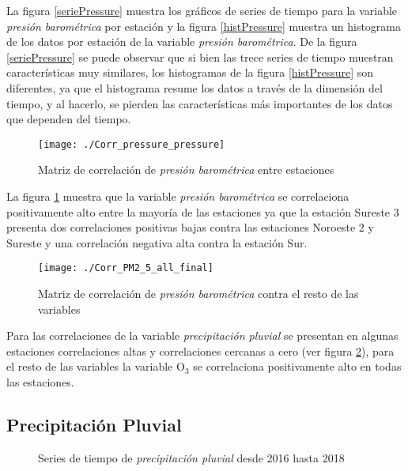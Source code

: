 La figura \ref{seriePressure} muestra los gráficos de series de tiempo para la variable {\em presión barométrica} por estación y la figura \ref{histPressure} muestra un histograma de los datos por estación de la variable {\em presión barométrica}. De la figura \ref{seriePressure} se puede observar que si bien las trece series de tiempo muestran características muy similares, los histogramas de la figura \ref{histPressure} son diferentes, ya que el histograma resume los datos a través de la dimensión del tiempo, y al hacerlo, se pierden las características más importantes de los datos que dependen del tiempo.

\begin{figure}[H]
\centering
\texttt{[image: ./Corr\_pressure\_pressure]}
\caption{Matriz de correlación de {\em presión barométrica} entre estaciones }
\label{corrpressure2}
\end{figure}

La figura \ref{corrpressure2} muestra que la variable {\em presión barométrica} se correlaciona positivamente alto entre la mayoría de las estaciones ya que la estación Sureste 3 presenta dos correlaciones positivas bajas contra las estaciones Noroeste 2 y Sureste y una correlación negativa alta contra la estación Sur.

\begin{figure}[H]
\centering
\texttt{[image: ./Corr\_PM2\_5\_all\_final]}
\caption{Matriz de correlación de {\em presión  barométrica} contra el resto de las variables}
\label{corrpressure}
\end{figure}

Para las correlaciones de la variable {\em precipitación pluvial} se presentan en algunas estaciones correlaciones altas y correlaciones cercanas a cero (ver figura \ref{corrpressure}), para el resto de las variables la variable O$_{3}$ se correlaciona positivamente alto en todas las estaciones.





\subsection{Precipitación Pluvial}
\begin{figure}[H]
\centering
{}
\caption{Series de tiempo de {\em precipitación pluvial} desde 2016 hasta 2018}
\label{serierainfall}
\end{figure}

